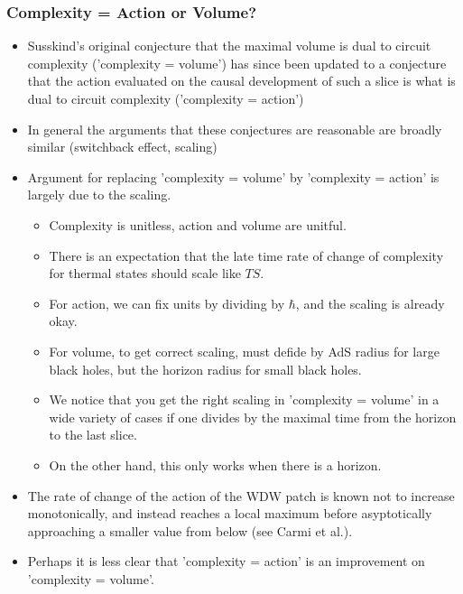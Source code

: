 \documentclass[8pt,aspectratio=169]{beamer}
\begin{document}
\begin{frame}
\frametitle{Complexity = Action or Volume?}

\begin{itemize}

\item Susskind's original conjecture that the maximal volume is dual to circuit complexity ('complexity = volume') has since been updated to a conjecture that the action evaluated on the causal development of such a slice is what is dual to circuit complexity ('complexity = action')

\item In general the arguments that these conjectures are reasonable are broadly similar (switchback effect, scaling)

\item Argument for replacing 'complexity = volume' by 'complexity = action' is largely due to the scaling. 

	\begin{itemize}
	
	\item Complexity is unitless, action and volume are unitful.
	
	\item There is an expectation that the late time rate of change of complexity for thermal states should scale like $TS$.
	
	\item For action, we can fix units by dividing by $\hbar$, and the scaling is already okay.
	
	\item For volume, to get correct scaling, must defide by AdS radius for large black holes, but the horizon radius for small black holes.
	
	\item We notice that you get the right scaling in 'complexity = volume' in a wide variety of cases if one divides by the maximal time from the horizon to the last slice.
	
	\item On the other hand, this only works when there is a horizon.
	
	\end{itemize}
	
\item The rate of change of the action of the WDW patch is known not to increase monotonically, and instead reaches a local maximum before asyptotically approaching a smaller value from below (see Carmi et al.).

\item Perhaps it is less clear that 'complexity = action' is an improvement on 'complexity = volume'.

\end{itemize}

\end{frame}
\end{document}
